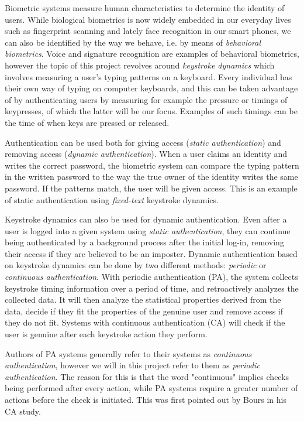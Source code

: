 \documentclass[informationsecurity]{gucmasterproject}
\begin{document}
Biometric systems measure human characteristics to determine the identity of users.
While biological biometrics is now widely embedded in our everyday lives such as fingerprint scanning and lately face recognition in our smart phones, we can also be identified by the way we behave, i.e. by means of \textit{behavioral biometrics}.
Voice and signature recognition are examples of behavioral biometrics, however the topic of this project revolves around \textit{keystroke dynamics} which involves measuring a user's typing patterns on a keyboard.
Every individual has their own way of typing on computer keyboards, and this can be taken advantage of by authenticating users by measuring for example the pressure or timings of keypresses, of which the latter will be our focus.
Examples of such timings can be the time of when keys are pressed or released. 

Authentication can be used both for giving access (\textit{static authentication}) and removing access (\textit{dynamic authentication}).
When a user claims an identity and writes the correct password, the biometric system can compare the typing pattern in the written password to the way the true owner of the identity writes the same password.
If the patterns match, the user will be given access.
This is an example of static authentication using \textit{fixed-text} keystroke dynamics.

Keystroke dynamics can also be used for dynamic authentication.
Even after a user is logged into a given system using \textit{static authentication}, they can continue being authenticated by a background process after the initial log-in, removing their access if they are believed to be an imposter.
Dynamic authentication based on keystroke dynamics can be done by two different methods: \textit{periodic} or \textit{continuous authentication}.
With periodic authentication (PA), the system collects keystroke timing information over a period of time, and retroactively analyzes the collected data.
It will then analyze the statistical properties derived from the data, decide if they fit the properties of the genuine user and remove access if they do not fit.
Systems with continuous authentication (CA) will check if the user is genuine after each keystroke action they perform.

Authors of PA systems generally refer to their systems as \textit{continuous authentication}, however we will in this project refer to them as \textit{periodic authentication}. 
The reason for this is that the word "continuous" implies checks being performed after every action, while PA systems require a greater number of actions before the check is initiated. 
This was first pointed out by Bours \cite{BOURS201236} in his CA study.
\end{document}
